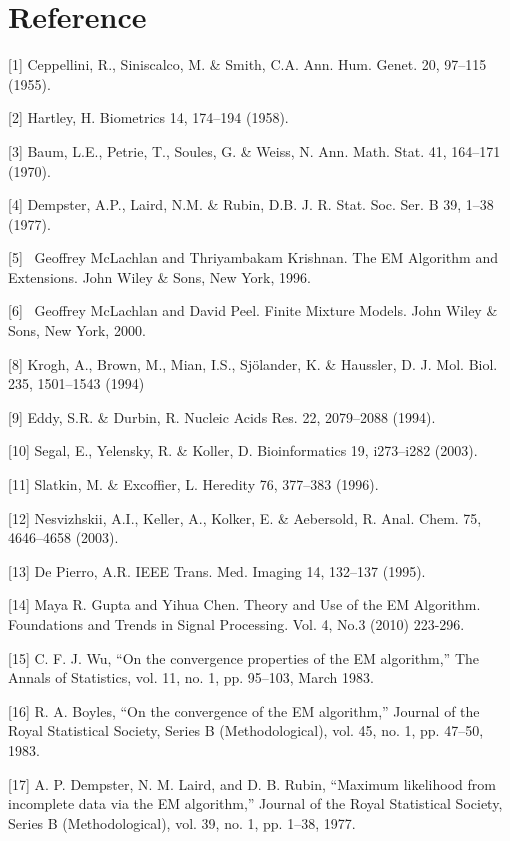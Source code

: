 \documentclass[onecolumn,12pt]{IEEEtran}
\begin{document}
\ifCLASSOPTIONcaptionsoff
  \newpage
\fi

%
%
%
\section{Reference}
[1] Ceppellini, R., Siniscalco, M. \& Smith, C.A. Ann. Hum. Genet. 20, 97–115 (1955). 

[2] Hartley, H. Biometrics 14, 174–194 (1958). 

[3] Baum, L.E., Petrie, T., Soules, G. \& Weiss, N. Ann. Math. Stat. 41, 164–171 (1970). 

[4] Dempster, A.P., Laird, N.M. \& Rubin, D.B. J. R. Stat. Soc. Ser. B 39, 1–38 (1977). 

[5]  Geoffrey McLachlan and Thriyambakam Krishnan. The EM Algorithm and Extensions. John Wiley \& Sons, New York, 1996. 

[6]  Geoffrey McLachlan and David Peel. Finite Mixture Models. John Wiley \& Sons, New York, 2000. 

[8] Krogh, A., Brown, M., Mian, I.S., Sjölander, K. \& Haussler, D. J. Mol. Biol. 235, 1501–1543 (1994)

[9] Eddy, S.R. \& Durbin, R. Nucleic Acids Res. 22, 2079–2088 (1994).

[10] Segal, E., Yelensky, R. \& Koller, D. Bioinformatics 19, i273–i282 (2003). 

[11] Slatkin, M. \& Excoffier, L. Heredity 76, 377–383 (1996).

[12] Nesvizhskii, A.I., Keller, A., Kolker, E. \& Aebersold, R. Anal. Chem. 75, 4646–4658 (2003).

[13] De Pierro, A.R. IEEE Trans. Med. Imaging 14, 132–137 (1995). 

[14] Maya R. Gupta and Yihua Chen. Theory and Use of the EM Algorithm. Foundations and Trends in Signal Processing. Vol. 4, No.3 (2010) 223-296.

[15] C. F. J. Wu, “On the convergence properties of the EM algorithm,” The Annals of Statistics, vol. 11, no. 1, pp. 95–103, March 1983.

[16] R. A. Boyles, “On the convergence of the EM algorithm,” Journal of the Royal Statistical Society, Series B (Methodological), vol. 45, no. 1, pp. 47–50, 1983.

[17] A. P. Dempster, N. M. Laird, and D. B. Rubin, “Maximum likelihood from incomplete data via the EM algorithm,” Journal of the Royal Statistical Society, Series B (Methodological), vol. 39, no. 1, pp. 1–38, 1977.
\end{document}
